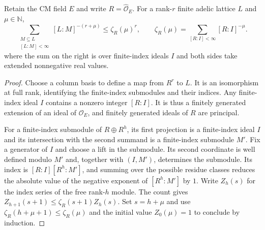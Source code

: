 \begin{lemma}
\label{lem:b-sublattice-index-zeta}
\emitthmsource
Retain the CM field $E$ and write $R=\widehat{\mathcal O}_E$. For a rank-$r$ finite adelic lattice $L$ and $\mu\in\mathbb N$,
\[
 \sum_{\substack{M\subseteq L\\ \left[L:M\right]<\infty}} [L:M]^{-(r+\mu)}
       \le \zeta_R(\mu)^r,\qquad
 \zeta_R(\mu)=\sum_{[R:I]<\infty}[R:I]^{-\mu}.
\]
where the sum on the right is over finite-index ideals $I$ and both sides take extended nonnegative real values.
\end{lemma}
\begin{proof}
Choose a column basis to define a map from $R^r$ to $L$. It is an isomorphism at full rank, identifying the finite-index submodules and their indices.
Any finite-index ideal $I$ contains a nonzero integer $[R:I]$. It is thus a finitely generated extension of an ideal of $\mathcal O_E$, and finitely generated ideals of $R$ are principal.

For a finite-index submodule of $R\oplus R^h$, its first projection is a finite-index ideal $I$ and its intersection with the second summand is a finite-index submodule $M'$. Fix a generator of $I$ and choose a lift in the submodule. Its second coordinate is well defined modulo $M'$ and, together with $(I,M')$, determines the submodule. Its index is $[R:I][R^h:M']$, and summing over the possible residue classes reduces the absolute value of the negative exponent of $[R^h:M']$ by $1$. Write $Z_h(s)$ for the index series of the free rank-$h$ module. The count gives $Z_{h+1}(s+1)\le \zeta_R(s+1) Z_h(s)$. Set $s=h+\mu$ and use $\zeta_R(h+\mu+1)\le\zeta_R(\mu)$ and the initial value $Z_0(\mu)=1$ to conclude by induction.
\end{proof}

